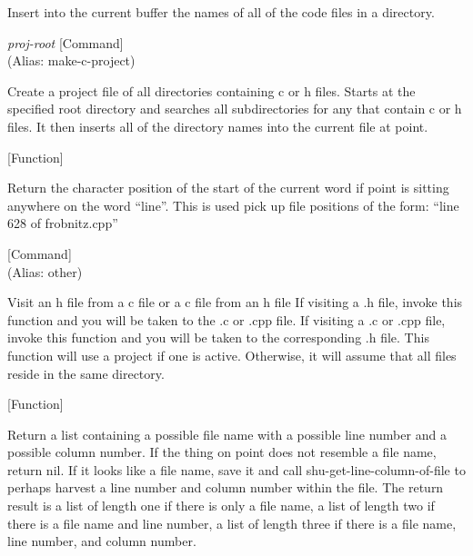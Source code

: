 \begin{doc-string}
Insert into the current buffer the names of all of the code files in a directory.
\end{doc-string}

\vspace{1em}
\noindent
{}
\usebox{\funcname}\emph{proj-root}
 \hfill [Command]\\%
 (Alias: make-c-project)

\begin{doc-string}
Create a project file of all directories containing c or h files.
Starts at the specified root directory and searches all subdirectories for
any that contain c or h files.  It then inserts all of the directory names
into the current file at point.
\end{doc-string}

\vspace{1em}
\noindent
{}
\usebox{\funcname}
 \hfill [Function]

\begin{doc-string}
Return the character position of the start of the current word if point is sitting
anywhere on the word ``line''.  This is used pick up file positions of the form:
``line 628 of frobnitz.cpp''
\end{doc-string}

\vspace{1em}
\noindent
{}
\usebox{\funcname}
 \hfill [Command]\\%
 (Alias: other)

\begin{doc-string}
Visit an h file from a c file or a c file from an h file If visiting a .h
file, invoke this function and you will be taken to the .c or .cpp file.  If
visiting a .c or .cpp file, invoke this function and you will be taken to the
corresponding .h file.  This function will use a project if one is active.
Otherwise, it will assume that all files reside in the same directory.
\end{doc-string}

\vspace{1em}
\noindent
{}
\usebox{\funcname}
 \hfill [Function]

\begin{doc-string}
Return a list containing a possible file name with a possible line number
and a possible column number.  If the thing on point does not resemble a file
name, return nil.  If it looks like a file name, save it and call
shu-get-line-column-of-file to perhaps harvest a line number and column number
within the file.  The return result is a list of length one if there is only
a file name, a list of length two if there is a file name and line number, a
list of length three if there is a file name, line number, and column number.
\end{doc-string}

